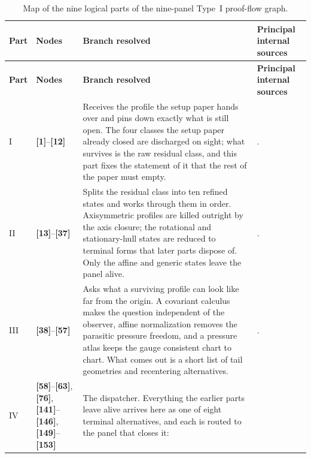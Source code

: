 \documentclass[11pt]{amsart}
\numberwithin{equation}{section}
\theoremstyle{plain}
\theoremstyle{definition}
\theoremstyle{remark}
\begin{document}
\begin{longtable}{@{}L{0.12\textwidth}L{0.14\textwidth}L{0.31\textwidth}L{0.35\textwidth}@{}}
\caption{Map of the nine logical parts of the nine-panel Type~I proof-flow graph.}
\label{tab:typeI-proof-flow-map}\\
\hline
\textbf{Part} & \textbf{Nodes} & \textbf{Branch resolved} &
\textbf{Principal internal sources}\\
\hline
\endfirsthead
\hline
\textbf{Part} & \textbf{Nodes} & \textbf{Branch resolved} &
\textbf{Principal internal sources}\\
\hline
\endhead
\hline
\endfoot
I & \textbf{[1]}--\textbf{[12]} &
Receives the profile the setup paper hands over and pins down exactly what is
still open.  The four classes the setup paper already closed are discharged on
sight; what survives is the raw residual class, and this part fixes the
statement of it that the rest of the paper must empty. &
.\\
II & \textbf{[13]}--\textbf{[37]} &
Splits the residual class into ten refined states and works through them in
order.  Axisymmetric profiles are killed outright by the axis closure; the
rotational and stationary-hull states are reduced to terminal forms that later
parts dispose of.  Only the affine and generic states leave the panel alive. &
.\\
III & \textbf{[38]}--\textbf{[57]} &
Asks what a surviving profile can look like far from the origin.  A covariant
calculus makes the question independent of the observer, affine normalization
removes the parasitic pressure freedom, and a pressure atlas keeps the gauge
consistent chart to chart.  What comes out is a short list of tail geometries
and recentering alternatives. &
.\\
IV & \textbf{[58]}--\textbf{[63]}, \textbf{[76]},
\textbf{[141]}--\textbf{[146]},
\textbf{[149]}--\textbf{[153]} &
The dispatcher.  Everything the earlier parts leave alive arrives here as one of
eight terminal alternatives, and each is routed to the panel that closes it:

\end{longtable}
\end{document}
